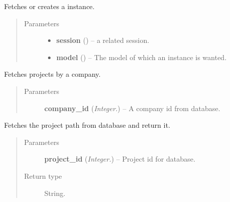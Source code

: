 \documentclass[letterpaper,10pt,english]{sphinxmanual}
\begin{document}

\begin{fulllineitems}
\label{api:controller.GetOrCreate}
Fetches or creates a instance.
\begin{quote}\begin{description}
\item[{Parameters}] \leavevmode\begin{itemize}
\item {} 
\textbf{session} ({\hyperref[api:models.Session]{}}) -- a related session.

\item {} 
\textbf{model} () -- The model of which an instance is wanted.

\end{itemize}

\end{description}\end{quote}

\end{fulllineitems}


\begin{fulllineitems}
\label{api:controller.GetProject}
Fetches projects by a company.
\begin{quote}\begin{description}
\item[{Parameters}] \leavevmode
\textbf{company\_id} (\emph{Integer.}) -- A company id from database.

\end{description}\end{quote}

\end{fulllineitems}


\begin{fulllineitems}
\label{api:controller.GetProjectPath}
Fetches the project path from database and return it.
\begin{quote}\begin{description}
\item[{Parameters}] \leavevmode
\textbf{project\_id} (\emph{Integer.}) -- Project id for database.

\item[{Return type}] \leavevmode
String.

\end{description}\end{quote}

\end{fulllineitems}
\end{document}
